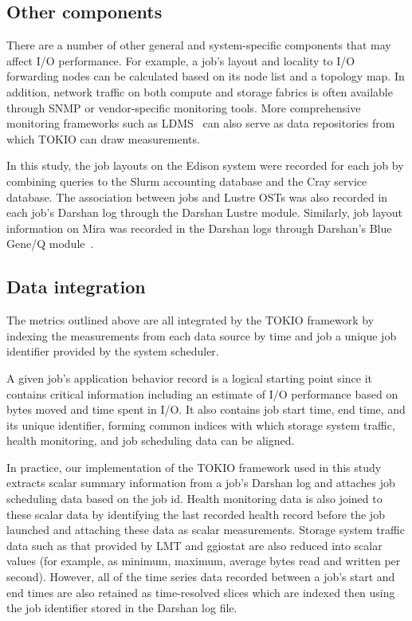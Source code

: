 \subsection{Other components} \label{sec:methods/other}

There are a number of other general and system-specific components that may affect I/O performance.  For example, a job's layout and locality to I/O forwarding nodes can be calculated based on its node list and a topology map.
In addition, network traffic on both compute and storage fabrics is often available through SNMP or vendor-specific monitoring tools.
More comprehensive monitoring frameworks such as LDMS~\cite{7013000} can also serve as data repositories from which TOKIO can draw measurements.

In this study, the job layouts on the Edison system were recorded for each job by combining queries to the Slurm accounting database and the Cray service database.
The association between jobs and Lustre OSTs was also recorded in each job's Darshan log through the Darshan Lustre module.
Similarly, job layout information on Mira was recorded in the Darshan logs through Darshan's Blue Gene/Q module~\cite{snyder2016modular}.

\subsection{Data integration} \label{sec:data-integration}

The metrics outlined above are all integrated by the TOKIO framework by indexing the measurements from each data source by time and job a unique job identifier provided by the system scheduler.

A given job's application behavior record is a logical starting point since it contains critical information including an estimate of I/O performance based on bytes moved and time spent in I/O.  It also contains job start time, end time, and its unique identifier, forming common indices with which storage system traffic, health monitoring, and job scheduling data can be aligned.

In practice, our implementation of the TOKIO framework used in this study  extracts scalar summary information from a job's Darshan log and attaches job scheduling data based on the job id.
Health monitoring data is also joined to these scalar data by identifying the last recorded health record before the job launched and attaching these data as scalar measurements.
Storage system traffic data such as that provided by LMT and ggiostat are also reduced into scalar values (for example, as minimum, maximum, average bytes read and written per second).
However, all of the time series data recorded between a job's start and end times are also retained as time-resolved slices which are indexed then using the job identifier stored in the Darshan log file.

